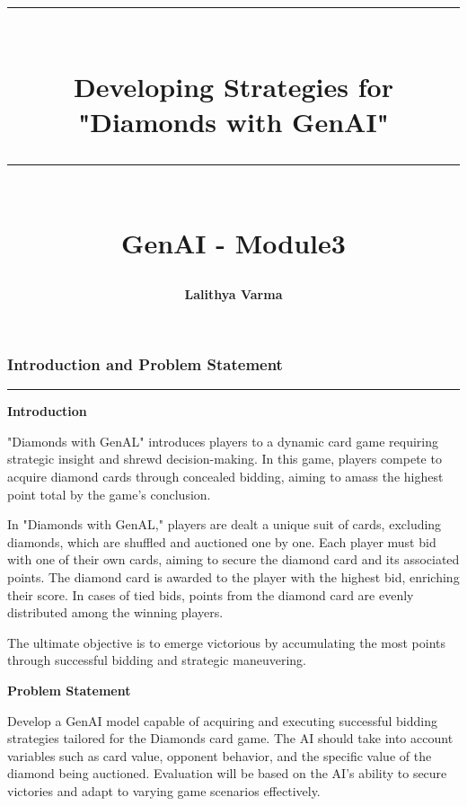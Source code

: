 \documentclass{article}
\newcommand{\HRule}[1]{\rule{\linewidth}{#1}}
\begin{document}
\title{ \normalsize \textsc{}
		\\ [2.0cm]
		\HRule{2.0pt} \\
		\Huge \textbf{{Developing Strategies for \\"Diamonds with GenAI"}}
		\HRule{2.0pt} \\ [0.6cm] \LARGE{GenAI - Module3} \vspace*{10\baselineskip}}
\date{}
\author{\textbf{Lalithya Varma}}

\maketitle
\newpage

\begin{frame}
\frametitle{\LARGE Introduction and Problem Statement}
\vspace{1cm}
\centering
\textcolor{gray}{\rule{\linewidth}{0.5pt}}
{\centering\textbf{\LARGE Introduction}\par}

\raggedright
\Large
"Diamonds with GenAL" introduces players to a dynamic card game requiring strategic insight and shrewd decision-making. In this game, players compete to acquire diamond cards through concealed bidding, aiming to amass the highest point total by the game's conclusion.

In "Diamonds with GenAL," players are dealt a unique suit of cards, excluding diamonds, which are shuffled and auctioned one by one. Each player must bid with one of their own cards, aiming to secure the diamond card and its associated points. The diamond card is awarded to the player with the highest bid, enriching their score. In cases of tied bids, points from the diamond card are evenly distributed among the winning players.

The ultimate objective is to emerge victorious by accumulating the most points through successful bidding and strategic maneuvering.
\vspace{1cm}

{\centering\textbf{\LARGE Problem Statement}\par}

\raggedright
\Large
Develop a GenAI model capable of acquiring and executing successful bidding strategies tailored for the Diamonds card game. The AI should take into account variables such as card value, opponent behavior, and the specific value of the diamond being auctioned. Evaluation will be based on the AI's ability to secure victories and adapt to varying game scenarios effectively.

\end{frame}
\end{document}
